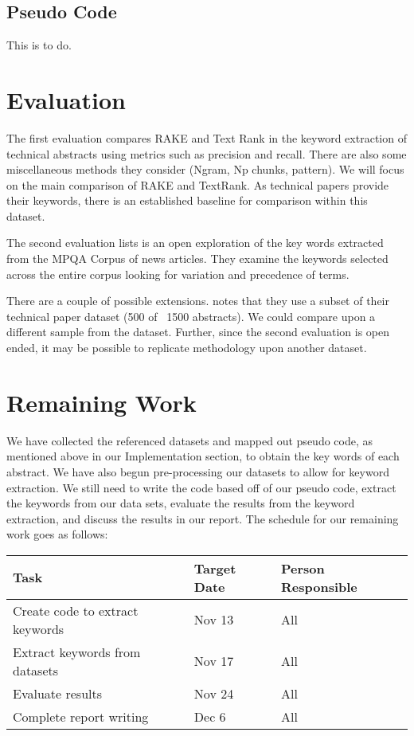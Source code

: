 \documentclass[11pt,a4paper]{article}
\begin{document}
\subsection {Pseudo Code}
This is to do.

\section{Evaluation}

The first evaluation compares RAKE and Text Rank in the keyword extraction of technical abstracts using metrics such as precision and recall. There are also some miscellaneous methods they consider (Ngram, Np chunks, pattern). We will focus on the main comparison of RAKE and TextRank. As technical papers provide their keywords, there is an established baseline for comparison within this dataset.

The second evaluation \citet{1} lists is an open exploration of the key words extracted from the MPQA Corpus of news articles. They examine the keywords selected across the entire corpus looking for variation and precedence of terms.   

There are a couple of possible extensions. \citet{1} notes that they use a subset of their technical paper dataset (500 of ~1500 abstracts).  We could compare upon a different sample from the dataset. Further, since the second evaluation is open ended, it may be possible to replicate  methodology upon another dataset.


\section{Remaining Work}

We have collected the referenced datasets and mapped out pseudo code, as mentioned above in our Implementation section, to obtain the key words of each abstract. We have also begun pre-processing our datasets to allow for keyword extraction. We still need to write the code based off of our pseudo code, extract the keywords from our data sets, evaluate the results from the keyword extraction, and discuss the results in our report. The schedule for our remaining work goes as follows:

\begin{table}[h]
\begin{center}
\begin{tabular}{|p{3.3cm}|p{1.4cm}|p{1.7cm}|}
\hline \bf Task & \bf Target Date & \bf Person  Responsible \\  
\hline
 Create code to extract keywords & Nov 13 & All \\ 
\hline 
 Extract keywords from datasets & Nov 17 & All \\
\hline
 Evaluate results & Nov 24 & All \\
\hline
Complete report writing & Dec 6 & All  \\
\hline   
\end{tabular}
\end{center}
\end{table}
\end{document}
